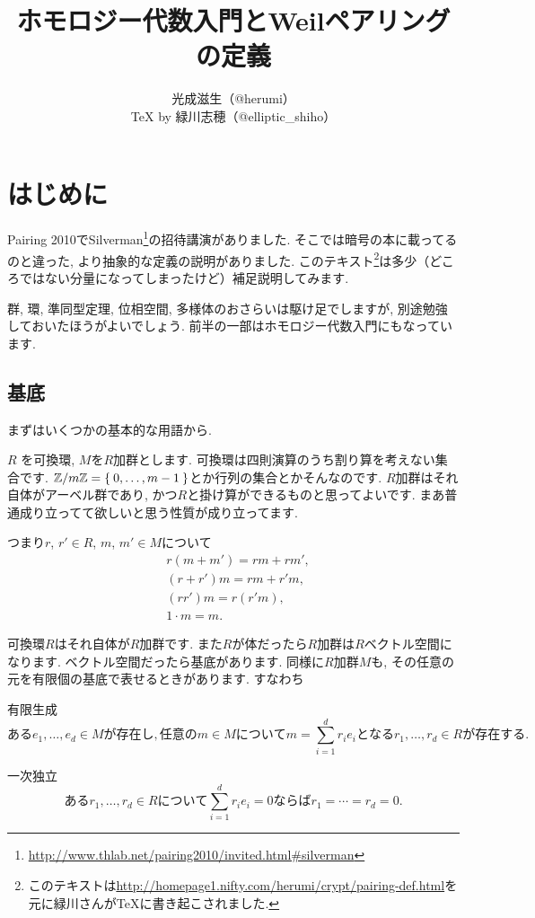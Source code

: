 \documentclass{jsarticle}
\title{ホモロジー代数入門とWeilペアリングの定義}
\author{光成滋生（@herumi）\\{\TeX} by 緑川志穂（@elliptic\_shiho）}
\date{}
\newcommand{\ZZ}{\mathbb{Z}}
\theoremstyle{definition}
\newcommand{\mydescription}[1]{
\begin{description}
\setlength{\itemindent}{2zw}
\setlength{\leftskip}{-2zw}
\setlength{\labelsep}{1zw}
#1
\end{description}
}
\numberwithin{theorem}{section}
\begin{document}
\maketitle

\tableofcontents

\section{はじめに}
Pairing 2010でSilverman\footnote{\url{http://www.thlab.net/pairing2010/invited.html\#silverman}}の招待講演がありました.
そこでは暗号の本に載ってるのと違った, より抽象的な定義の説明がありました.
このテキスト\footnote{このテキストは\url{http://homepage1.nifty.com/herumi/crypt/pairing-def.html}を元に緑川さんがTeXに書き起こされました.}は多少（どころではない分量になってしまったけど）補足説明してみます.

群, 環, 準同型定理, 位相空間, 多様体のおさらいは駆け足でしますが, 別途勉強しておいたほうがよいでしょう.
前半の一部はホモロジー代数入門にもなっています.

\subsection{基底}
まずはいくつかの基本的な用語から.

$R$ を可換環, $M$を$R$加群とします. 可換環は四則演算のうち割り算を考えない集合です. $\ZZ/m\ZZ=\Set{0, \dots, m-1}$とか行列の集合とかそんなのです.
$R$加群はそれ自体がアーベル群であり, かつ$R$と掛け算ができるものと思ってよいです.
まあ普通成り立ってて欲しいと思う性質が成り立ってます.

つまり$r$, $r' \in R$, $m$, $m' \in M$について
\begin{align*}
& r(m + m') = rm + rm',\\
& (r+r')m = rm + r'm,\\
& (rr')m = r(r'm),\\
& 1 \cdot m =m.
\end{align*}

可換環$R$はそれ自体が$R$加群です. また$R$が体だったら$R$加群は$R$ベクトル空間になります.
ベクトル空間だったら基底があります.
同様に$R$加群$M$も, その任意の元を有限個の基底で表せるときがあります. すなわち
\mydescription{
\item[有限生成]
\[
ある e_1, \ldots, e_d\in M が存在し, 任意の m\in Mについて m = \sum_{i=1}^d r_i e_i となる r_1, \ldots, r_d \in R が存在する.
\]
\item[一次独立]
\[
あるr_1, \ldots, r_d \in Rについて \sum_{i=1}^d r_i e_i = 0 ならば r_1=\cdots=r_d=0.
\]
}
\end{document}
